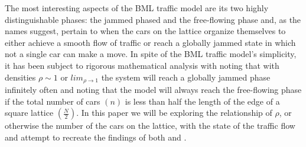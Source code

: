 \noindent The most interesting aspects of the BML traffic model are its two highly distinguishable phases: the jammed phased and the free-flowing phase and, as the names suggest, pertain to when the cars on the lattice organize themselves to either achieve a smooth flow of traffic or reach a globally jammed state in which not a single car can make a move. In spite of the BML traffic model's simplicity, it has been subject to rigorous mathematical analysis with \citet{Omer} noting that with densities $\rho \sim 1$ or $lim_{\rho \to 1}$ the system will reach a globally jammed phase infinitely often and \citet{Austin} noting that the model will always reach the free-flowing phase if the total number of cars $(n)$ is less than half the length of the edge of a square lattice $(\frac{N}{2})$. In this paper we will be exploring the relationship of $\rho$, or otherwise the number of the cars on the lattice, with the state of the traffic flow and attempt to recreate the findings of both \citeauthor{Omer} and \citeauthor{Austin}.